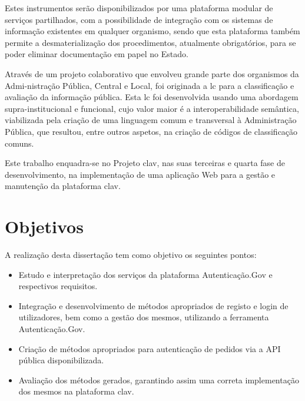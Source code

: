 Estes instrumentos serão disponibilizados por uma plataforma modular de serviços partilhados, com a possibilidade de integração com os sistemas de informação existentes em qualquer organismo, sendo que esta plataforma também permite a desmaterialização dos procedimentos, atualmente obrigatórios, para se poder eliminar documentação em papel no Estado.

Através de um projeto colaborativo que envolveu grande parte dos organismos da Admi-nistração Pública, Central e Local, foi originada a \gls{lc} para a classificação e avaliação da informação pública. Esta \gls{lc} foi desenvolvida usando uma abordagem supra-institucional e funcional, cujo valor maior é a interoperabilidade semântica, viabilizada pela criação de uma linguagem comum e transversal à Administração Pública, que resultou, entre outros aspetos, na criação de códigos de classificação comuns.

Este trabalho enquadra-se no Projeto \gls{clav}, nas suas terceiras e quarta fase de desenvolvimento, na implementação de uma aplicação Web para a gestão e manutenção da plataforma \gls{clav}. 


\cleardoublepage
\section{Objetivos}

A realização desta dissertação tem como objetivo os seguintes pontos:

\begin{itemize}
    \item Estudo e interpretação dos serviços da plataforma Autenticação.Gov e respectivos requisitos.
    \item Integração e desenvolvimento de métodos apropriados de registo e login de utilizadores, bem como a gestão dos mesmos, utilizando a ferramenta Autenticação.Gov.
    \item Criação de métodos apropriados para autenticação de pedidos via a API pública disponibilizada.
    \item Avaliação dos métodos gerados, garantindo assim uma correta implementação dos mesmos na plataforma \gls{clav}.
\end{itemize}

